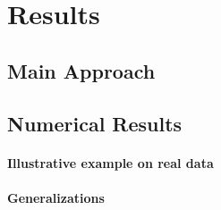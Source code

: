 \documentclass[10pt]{article}
\begin{document}
\section{Results}

\subsection{Main Approach}

\subsection{Numerical Results}

\paragraph{Illustrative example on real data}



\paragraph{Generalizations}


\end{document}
